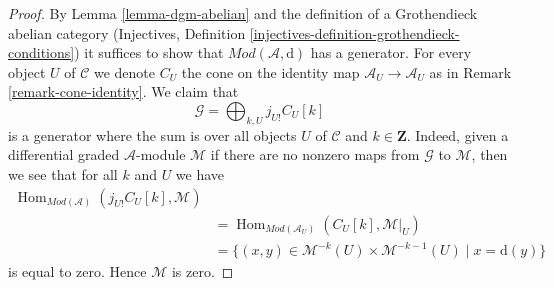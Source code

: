 \documentclass[10pt,a4paper]{amsart}
\theoremstyle{plain}
\theoremstyle{definition}
\theoremstyle{remark}
\numberwithin{equation}{subsection}
\def\Hom{\mathop{\mathrm{Hom}}\nolimits}
\begin{document}
\begin{proof}
By Lemma \ref{lemma-dgm-abelian} and the definition of a Grothendieck
abelian category
(Injectives, Definition \ref{injectives-definition-grothendieck-conditions})
it suffices to
show that $\textit{Mod}(\mathcal{A}, \text{d})$
has a generator. For every object $U$ of $\mathcal{C}$ we denote
$C_U$ the cone on the identity map $\mathcal{A}_U \to \mathcal{A}_U$
as in Remark \ref{remark-cone-identity}. We claim that
$$
\mathcal{G} = \bigoplus\nolimits_{k, U} j_{U!}C_U[k]
$$
is a generator where the sum is over all objects $U$ of $\mathcal{C}$
and $k \in \mathbf{Z}$. Indeed, given a
differential graded $\mathcal{A}$-module $\mathcal{M}$
if there are no nonzero maps from $\mathcal{G}$ to $\mathcal{M}$,
then we see that for all $k$ and $U$ we have
\begin{align*}
\Hom_{\textit{Mod}(\mathcal{A})}(j_{U!}C_U[k], \mathcal{M}) \\
& =
\Hom_{\textit{Mod}(\mathcal{A}_U)}(C_U[k], \mathcal{M}|_U) \\
& =
\{(x, y) \in \mathcal{M}^{-k}(U) \times \mathcal{M}^{-k - 1}(U) \mid
x = \text{d}(y)\}
\end{align*}
is equal to zero. Hence $\mathcal{M}$ is zero.
\end{proof}
\end{document}
